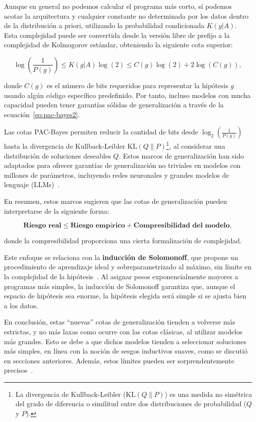 Aunque en general no podemos calcular el programa más corto, sí podemos acotar la arquitectura y cualquier constante no determinada por los datos dentro de la distribución a priori, utilizando la probabilidad condicionada $K(g|A)$. Esta complejidad puede ser convertida desde la versión libre de prefijo a la complejidad de Kolmogorov estándar, obteniendo la siguiente cota superior:

\begin{equation}
    \log \left( \frac{1}{P(g)} \right) \leq K(g|A)\log (2) \leq C(g)\log (2) + 2\log (C(g)),
\end{equation}
    
donde $C(g)$ es el número de bits requeridos para representar la hipótesis $g$ usando algún código específico predefinido. Por tanto, incluso modelos con mucha capacidad pueden tener garantías sólidas de generalización a través de la ecuación~\eqref{eq:pac-bayes2}.

Las cotas PAC-Bayes permiten reducir la cantidad de bits desde $\log_2 \left( \frac{1}{P(g)} \right)$ hasta la divergencia de Kullback-Leibler $\text{KL}(Q \| P)$\footnote{La divergencia de Kullback-Leibler ($\text{KL}(Q \| P)$) es una medida no simétrica del grado de diferencia o similitud entre dos distribuciones de probabilidad ($Q$ y $P$).}, al considerar una distribución de soluciones deseables $Q$. Estos marcos de generalización han sido adaptados para ofrecer garantías de generalización no triviales en modelos con millones de parámetros, incluyendo redes neuronales y grandes modelos de lenguaje (LLMs)~\cite{Lotfi2024}.

En resumen, estos marcos sugieren que las cotas de generalización pueden interpretarse de la siguiente forma:

\[
    \textbf{Riesgo real} \leq \textbf{Riesgo empírico} + \textbf{Compresibilidad del modelo},
\]

donde la compresibilidad proporciona una cierta formalización de complejidad.

Este enfoque se relaciona con la \textbf{inducción de Solomonoff}, que propone un procedimiento de aprendizaje ideal y sobreparametrizado al máximo, sin límite en la complejidad de la hipótesis~\cite{Solomonoff1964}. Al asignar pesos exponencialmente mayores a programas más simples, la inducción de Solomonoff garantiza que, aunque el espacio de hipótesis sea enorme, la hipótesis elegida será simple si se ajusta bien a los datos.

En conclusión, estas ``nuevas'' cotas de generalización tienden a volverse más estrictas, y no más laxas como ocurre con las cotas clásicas, al utilizar modelos más grandes. Esto se debe a que dichos modelos tienden a seleccionar soluciones más simples, en línea con la noción de sesgos inductivos suaves, como se discutió en secciones anteriores. Además, estos límites pueden ser sorprendentemente precisos~\cite{Lotfi2022}.

